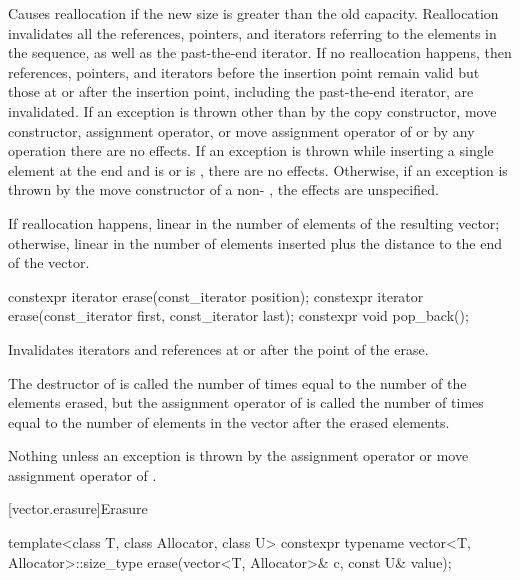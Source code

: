 \begin{itemdescr}
\pnum
\remarks
Causes reallocation if the new size is greater than the old capacity.
Reallocation invalidates all the references, pointers, and iterators
referring to the elements in the sequence, as well as the past-the-end iterator.
If no reallocation happens, then
references, pointers, and iterators
before the insertion point remain valid
but those at or after the insertion point,
including the past-the-end iterator,
are invalidated.
If an exception is thrown other than by
the copy constructor, move constructor,
assignment operator, or move assignment operator of
 or by any  operation
there are no effects.
If an exception is thrown while inserting a single element at the end and
 is  or 
is , there are no effects.
Otherwise, if an exception is thrown by the move constructor of a non-
, the effects are unspecified.

\pnum
\complexity
If reallocation happens,
linear in the number of elements of the resulting vector;
otherwise,
linear in the number of elements inserted plus the distance
to the end of the vector.
\end{itemdescr}

%
\begin{itemdecl}
constexpr iterator erase(const_iterator position);
constexpr iterator erase(const_iterator first, const_iterator last);
constexpr void pop_back();
\end{itemdecl}

\begin{itemdescr}
\pnum
\effects
Invalidates iterators and references at or after the point of the erase.

\pnum
\complexity
The destructor of  is called the number of times equal to the
number of the elements erased, but the assignment operator
of  is called the number of times equal to the number of
elements in the vector after the erased elements.

\pnum
\throws
Nothing unless an exception is thrown by the
assignment operator or move assignment operator of
.
\end{itemdescr}

[vector.erasure]{Erasure}

%
\begin{itemdecl}
template<class T, class Allocator, class U>
  constexpr typename vector<T, Allocator>::size_type
    erase(vector<T, Allocator>& c, const U& value);
\end{itemdecl}

